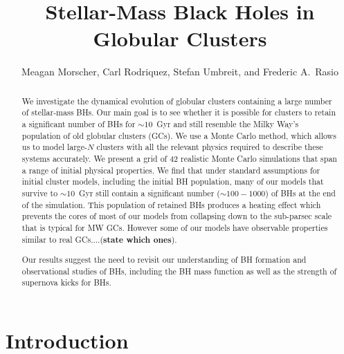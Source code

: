 \documentclass[12pt,preprint]{aastex}
\begin{document}
\title{Stellar-Mass Black Holes in Globular Clusters}
  
\author{Meagan Morscher, Carl Rodriquez, Stefan Umbreit, and Frederic A.\ Rasio}





\begin{abstract}
We investigate the dynamical evolution of globular clusters containing a large number of stellar-mass BHs. Our main goal is to see whether it is possible for clusters to retain a significant number of BHs for $\sim 10\,$ Gyr and still resemble the Milky Way's population of old globular clusters (GCs). We use a Monte Carlo method, which allows us to model large-$N$ clusters with all the relevant physics required to describe these systems accurately. We present a grid of 42 realistic Monte Carlo simulations that span a range of initial physical properties. We find that under standard assumptions for initial cluster models, including the initial BH population, many of our models that survive to $\sim 10\,$ Gyr still contain a significant number ($\sim 100-1000$) of BHs at the end of the simulation. This population of retained BHs produces a heating effect which prevents the cores of most of our models from collapsing down to the sub-parsec scale that is typical for MW GCs. However some of our models have observable properties similar to real GCs....(\textbf{state which ones}). 

Our results suggest the need to revisit our understanding of BH formation and observational studies of BHs, including the BH mass function as well as the strength of supernova kicks for BHs.

\end{abstract}




\section{Introduction} \label{Intro}
\end{document}
